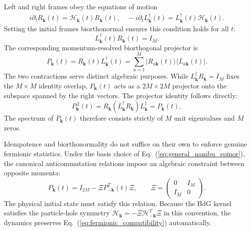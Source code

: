 \documentclass[aps,prb,reprint,superscriptaddress,amsmath,amssymb,floatfix]{revtex4-2}
\begin{document}
  Left and right frames obey the equations of motion
\begin{equation}
\begin{aligned}
i\partial_t R_{\bm k}(t) = \mathcal H_{\bm k}(t)R_{\bm k}(t), \quad -i\partial_t L_{\bm k}^{\dagger}(t) = L_{\bm k}^{\dagger}(t)\mathcal H_{\bm k}(t).
\end{aligned} \label{eq:general_LR_evolution}
\end{equation}
Setting the initial frames biorthonormal ensures this condition holds for all $t$:
\begin{equation}
L_{\bm k}^{\dagger}(t)R_{\bm k}(t)=I_M .
\label{eq:general_bio_norm_time}
\end{equation}
The corresponding momentum-resolved biorthogonal projector is
\begin{equation}
P_{\bm k}(t) = R_{\bm k}(t)L_{\bm k}^{\dagger}(t) = \sum_{a=1}^{M} |R_{a\bm k}(t)\rangle \langle L_{a\bm k}(t)|.
\label{eq:general_Pk}
\end{equation}
The two contractions serve distinct algebraic purposes. While $L_{\bm k}^{\dagger}R_{\bm k}=I_M$ fixes the $M\times M$ identity overlap, $P_{\bm k}(t)$ acts as a $2M\times2M$ projector onto the subspace spanned by the right vectors. The projector identity follows directly:
\begin{equation}
P_{\bm k}^{\,2}(t) = R_{\bm k} \left(L_{\bm k}^{\dagger}R_{\bm k}\right) L_{\bm k}^{\dagger} = P_{\bm k}(t),
\label{eq:general_Pk_projector}
\end{equation}
The spectrum of $P_{\bm k}(t)$ therefore consists strictly of $M$ unit eigenvalues and $M$ zeros.

  Idempotence and biorthonormality do not suffice on their own to enforce genuine fermionic statistics. Under the basis choice of Eq.~(\ref{eq:general_nambu_spinor}), the canonical anticommutation relations impose an algebraic constraint between opposite momenta:
\begin{equation}
P_{\bm k}(t) = I_{2M} - \Xi P_{-\bm k}^{T}(t)\Xi, \qquad \Xi= \begin{pmatrix} 0&I_M\\ I_M&0 \end{pmatrix}.
\label{eq:fermionic_compatibility}
\end{equation}
The physical initial state must satisfy this relation. Because the BdG kernel satisfies the particle-hole symmetry $\mathcal H_{\bm k}=-\Xi\mathcal H_{-\bm k}^{T}\Xi$ in this convention, the dynamics preserves Eq.~(\ref{eq:fermionic_compatibility}) automatically.
\end{document}

